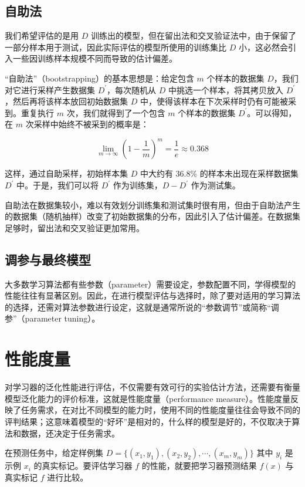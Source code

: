 \documentclass[12pt, a4paper]{article} %
\begin{document}
\subsection{自助法}

我们希望评估的是用 $D$ 训练出的模型，但在留出法和交叉验证法中，由于保留了一部分样本用于测试，因此实际评估的模型所使用的训练集比 $D$ 小，这必然会引入一些因训练样本规模不同而导致的估计偏差。

“自助法”（bootstrapping）的基本思想是：给定包含 $m$ 个样本的数据集 $D$，我们对它进行采样产生数据集 $D ^\prime$，每次随机从 $D$ 中挑选一个样本，将其拷贝放入 $D ^\prime$，然后再将该样本放回初始数据集 $D$ 中，使得该样本在下次采样时仍有可能被采到。重复执行 $m$ 次，我们就得到了一个包含 $m$ 个样本的数据集 $D ^\prime$。可以得知，在 $m$ 次采样中始终不被采到的概率是：

\begin{equation}
    \lim_{m \to \infty} (1 - \frac{1}{m})^m = \frac{1}{e} \approx 0.368
\end{equation}

这样，通过自助采样，初始样本集 $D$ 中大约有 $36.8\%$ 的样本未出现在采样数据集 $D ^\prime$ 中。于是，我们可以将 $D ^\prime$ 作为训练集，$D - D^\prime$ 作为测试集。

自助法在数据集较小，难以有效划分训练集和测试集时很有用，但由于自助法产生的数据集（随机抽样）改变了初始数据集的分布，因此引入了估计偏差。在数据集足够时，留出法和交叉验证更加常用。

\subsection{调参与最终模型}

大多数学习算法都有些参数（parameter）需要设定，参数配置不同，学得模型的性能往往有显著区别。因此，在进行模型评估与选择时，除了要对适用的学习算法的选择，还需对算法参数进行设定，这就是通常所说的“参数调节”或简称“调参”（parameter tuning）。

\section{性能度量}

对学习器的泛化性能进行评估，不仅需要有效可行的实验估计方法，还需要有衡量模型泛化能力的评价标准，这就是性能度量（performance measure）。性能度量反映了任务需求，在对比不同模型的能力时，使用不同的性能度量往往会导致不同的评判结果；这意味着模型的“好坏”是相对的，什么样的模型是好的，不仅取决于算法和数据，还决定于任务需求。

在预测任务中，给定样例集 $D = \{(x_1, y_1), (x_2, y_2), \cdots, (x_m, y_m)\}$ 其中 $y_i$ 是示例 $x_i$ 的真实标记。要评估学习器  $f$ 的性能，就要把学习器预测结果 $f(x)$ 与真实标记 $f$ 进行比较。
\end{document}
